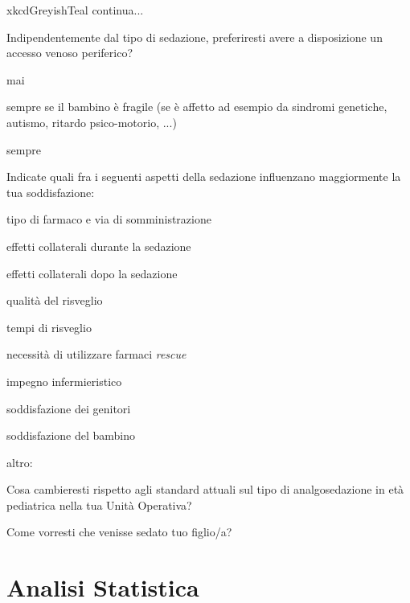 \begin{survey}{xkcdGreyishTeal}
       \hfill continua...
       
       \newpage
       
       \Query Indipendentemente dal tipo di sedazione, preferiresti avere a disposizione un accesso venoso periferico?
       \begin{Qlist}
           \item mai
           \item sempre se il bambino è fragile (se è affetto ad esempio da sindromi genetiche, autismo, ritardo psico-motorio, ...)
           \item sempre
       \end{Qlist}
       
       \Query Indicate quali fra i seguenti aspetti della sedazione influenzano maggiormente la tua soddisfazione:
       \begin{Qlist}
            \item tipo di farmaco e via di somministrazione
            \item effetti collaterali durante la sedazione
            \item effetti collaterali dopo la sedazione
            \item qualità del risveglio
            \item tempi di risveglio
            \item necessità di utilizzare farmaci \emph{rescue}
            \item impegno infermieristico
            \item soddisfazione dei genitori
            \item soddisfazione del bambino
            \item altro: \Qline{6cm}
       \end{Qlist}
       
       \Query Cosa cambieresti rispetto agli standard attuali sul tipo di analgosedazione in età pediatrica nella tua Unità Operativa? 
       
       \Query Come vorresti che venisse sedato tuo figlio/a? 
       
       \bigskip
       
\end{survey}

\section{Analisi Statistica}

